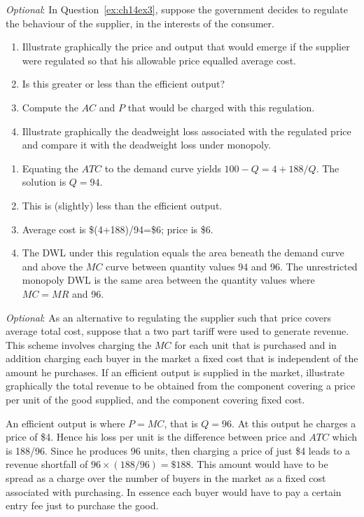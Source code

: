 \begin{enumialphparenastyle}
\begin{econex}\label{ex:ch14ex4}
\textit{Optional}: In Question~\ref{ex:ch14ex3}, suppose the government decides to regulate the behaviour of the supplier, in the interests of the consumer. 
\begin{enumerate}
\item	Illustrate graphically the price and output that would emerge if the supplier were regulated so that his allowable price equalled average cost. 
\item	Is this greater or less than the efficient output?
\item	Compute the $AC$ and $P$ that would be charged with this regulation.
\item	Illustrate graphically the deadweight loss associated with the regulated price and compare it with the deadweight loss under monopoly. 
\end{enumerate}
\begin{econsolution}
\begin{enumerate}
\item	Equating the $ATC$ to the demand curve yields $100-Q=4+188/Q$. The solution is $Q=94$.
\item	This is (slightly) less than the efficient output.
\item	Average cost is \$(4+188)/94=\$6; price is \$6.
\item	The DWL under this regulation equals the area beneath the demand curve and above the $MC$ curve between quantity values 94 and 96. The unrestricted monopoly DWL is the same area between the quantity values where $MC=MR$ and 96.
\end{enumerate}
\end{econsolution}
\end{econex}

\begin{econex}\label{ex:ch14ex5}
\textit{Optional}: As an alternative to regulating the supplier such that price covers average total cost, suppose that a two part tariff were used to generate revenue. This scheme involves charging the $MC$ for each unit that is purchased and in addition charging each buyer in the market a fixed cost that is independent of the amount he purchases. If an efficient output is supplied in the market, illustrate graphically the total revenue to be obtained from the component covering a price per unit of the good supplied, and the component covering fixed cost.
\begin{econsolution}
An efficient output is where $P=MC$, that is $Q=96$. At this output he charges a price of \$4. Hence his loss per unit is the difference between price and $ATC$ which is 188/96. Since he produces 96 units, then charging a price of just \$4 leads to a revenue shortfall of $96\times (188/96)=\$188$. This amount would have to be spread as a charge over the number of buyers in the market as a fixed cost associated with purchasing. In essence each buyer would have to pay a certain entry fee just to purchase the good.

\end{econsolution}
\end{econex}

\end{enumialphparenastyle}
